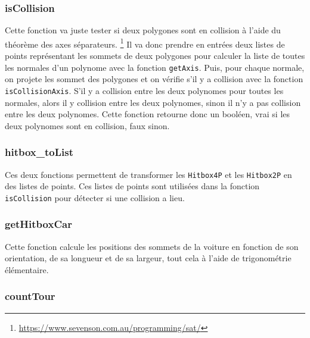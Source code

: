 \documentclass[11pt, final]{report}
\renewcommand{\tt}[1]{\texttt{#1}}
\begin{document}
\subsubsection{isCollision}



Cette fonction va juste tester si deux polygones sont en collision à l'aide du théorème des axes séparateurs. \footnote{\url{https://www.sevenson.com.au/programming/sat/}}
Il va donc prendre en entrées deux listes de points représentant les sommets de deux polygones pour calculer la liste de toutes les normales d'un polynome avec la fonction \tt{getAxis}. Puis, pour chaque normale, on projete les sommet des polygones et on vérifie s'il y a collision avec la fonction \tt{isCollisionAxis}. S'il y a collision entre les deux polynomes pour toutes les normales, alors il y collision entre les deux polynomes, sinon il n'y a pas collision entre les deux polynomes.
Cette fonction retourne donc un booléen, vrai si les deux polynomes sont en collision, faux sinon.
\\

\subsubsection{hitbox\_toList}



Ces deux fonctions permettent de transformer les \tt{Hitbox4P} et les \tt{Hitbox2P} en des listes de points. Ces listes de points sont utilisées dans la fonction \tt{isCollision} pour détecter si une collision a lieu.
\\

\subsubsection{getHitboxCar}



Cette fonction calcule les positions des sommets de la voiture en fonction de son orientation, de sa longueur et de sa largeur, tout cela à l'aide de trigonométrie élémentaire.
\\

\subsubsection{countTour}

\end{document}
